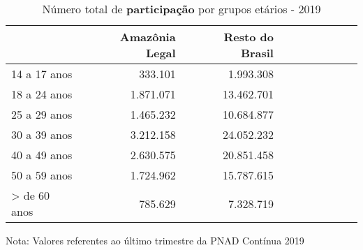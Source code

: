 \begin{table}[H]
\centering
\label{\_retrato\_emprego\_fotografia\_faixa\_etaria\_table\_participacao}
\begin{threeparttable}
\caption{Número total de \textbf{participação} por grupos etários - 2019}
\begin{tabular}{l*{3}{rrr}}
\midrule \midrule
                    &Amazônia Legal&Resto do Brasil\\
\midrule
14 a 17 anos        &     333.101&   1.993.308\\
18 a 24 anos        &   1.871.071&  13.462.701\\
25 a 29 anos        &   1.465.232&  10.684.877\\
30 a 39 anos        &   3.212.158&  24.052.232\\
40 a 49 anos        &   2.630.575&  20.851.458\\
50 a 59 anos        &   1.724.962&  15.787.615\\
> de 60 anos        &     785.629&   7.328.719\\
\bottomrule
\end{tabular}
\begin{tablenotes}
\scriptsize{Nota: Valores referentes ao último trimestre da PNAD Contínua 2019}
\end{tablenotes}
\end{threeparttable}
\end{table}
